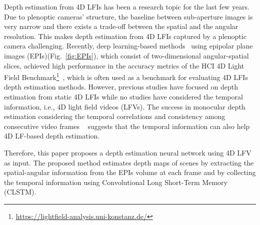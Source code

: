 \documentclass[]{spie}
\newcommand{\jtextd}[1]{}
\begin{document}
Depth estimation from 4D LFIs has been a
research topic for the last few years.
Due to plenoptic cameras'
structure, the baseline between sub-aperture images
is very narrow
and there exists a trade-off between the spatial and the angular resolution.
This makes depth estimation from 4D LFIs captured by a plenoptic camera challenging.
Recently, deep learning-based methods~\cite{shin2018epinet,faluvegi20193d}
using epipolar plane images (EPIs)(Fig.~\ref{fig:EPIs}), 
which consist of two-dimensional angular-spatial slices, 
achieved high performance
in the accuracy metrics of the HCI 4D Light Field
Benchmark\footnote{\url{https://lightfield-analysis.uni-konstanz.de/}}~\cite{honauer2016benchmark},
which is often used as a benchmark for evaluating 
4D LFIs depth estimation methods.
However, previous studies have focused on depth estimation from static
4D LFIs while no studies have considered
the temporal information, i.e., 4D light field videos (LFVs).
The success in monocular depth estimation considering the temporal
correlations and consistency among consecutive video frames
~\cite{zhang2019exploiting}
suggests that the temporal information can also help
4D LF-based depth estimation.

\jtextd{
  このため，本研究では，4D LFVsを入力とする奥行き推定ニューラルネットワークを提案する．
  提案手法は，各フレームのEPIsボリュームから空間-角度情報を抽出し，
  Convolutional Long Short-Term Memory（CLSTM）
を用いて時間情報を集約することでシーンの奥行きマップを推定している．
}

Therefore, this paper proposes a depth estimation neural network using
4D LFV as input.
The proposed method estimates depth maps of scenes 
by extracting the spatial-angular information from the EPIs volume at each frame and 
by collecting the temporal information using Convolutional Long Short-Term 
Memory (CLSTM).

\jtextd{
  本研究の貢献を以下に示す．
\begin{itemize}
  
  \item オープンソースの映画``Sintel''~\cite{sintel2010}
を使用し，深層学習モデルを十分に訓練可能な中規模4D LFVsデータセットを作成した．
  
  \item 著者らの知る限り，4D LFVに記録された空間-角度-時間情報を用いた奥行き推定は
    本研究が初となる．
  
  \item 合成映像および実撮影映像を用いた実験により，時系列情報が4D LFベースの
    奥行き推定の性能向上に寄与することを示した．
   
  \end{itemize}
}
\end{document}
